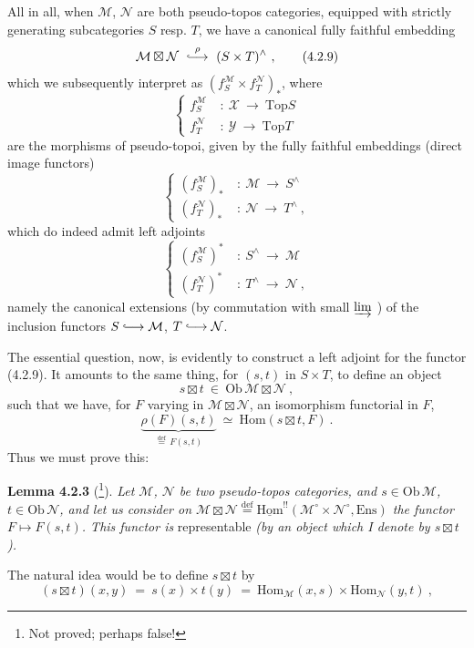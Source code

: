 \documentclass[11pt]{article}
\newcommand{\printedpage}[1]{\marginpar{\footnotesize p.~#1}}
\newcommand{\msp}[1]{\marginpar{\footnotesize [#1]}}
\newcommand{\cM}{\mathcal{M}}
\newcommand{\cN}{\mathcal{N}}
\newcommand{\cX}{\mathcal{X}}
\newcommand{\cY}{\mathcal{Y}}
\newcommand{\uHom}{\underline{\mathrm{Hom}}}
\newcommand{\Hom}{\mathrm{Hom}}
\newcommand{\Ens}{\mathrm{Ens}}
\newcommand{\Top}{\mathrm{Top}}
\newcommand{\Ob}{\mathrm{Ob}\,}
\newcommand{\defeq}{\overset{\text{def}}{=}}
\newcommand{\bt}{\boxtimes}
\newcommand{\linj}{\lhook\joinrel\longrightarrow}
\begin{document}
All in all, when $\cM$, $\cN$ are both pseudo-topos categories, equipped with strictly generating subcategories $S$ resp. $T$, we have a canonical fully faithful embedding
\[
\cM\bt\cN \ \overset{\rho}{\linj}\ (S\times T)^{\wedge} \ ,
\tag*{(4.2.9)}
\]
\printedpage{7}
which we subsequently interpret as $(f_{S}^{\cM}\times f_{T}^{\cN})_{*}$, where
\[
\left\{
\begin{aligned}
f_{S}^{\cM} \ &:\ \cX \ \longrightarrow\ \Top S\\
f_{T}^{\cN} \ &:\ \cY \ \longrightarrow\ \Top T
\end{aligned}
\right.
\tag*{(4.2.10)}
\]
are the morphisms of pseudo-topoi, given by the fully faithful embeddings (direct image functors)
\[
\left\{
\begin{aligned}
(f_{S}^{\cM})_{*} \ &:\ \cM \ \longrightarrow\ S^{\wedge}\\
(f_{T}^{\cN})_{*} \ &:\ \cN \ \longrightarrow\ T^{\wedge} \ ,
\end{aligned}
\right.
\tag*{(4.2.11)}
\]
which do indeed admit left adjoints
\msp{page 63}
\[
\left\{
\begin{aligned}
(f_{S}^{\cM})^{*} \ &:\ S^{\wedge} \ \longrightarrow\ \cM\\
(f_{T}^{\cN})^{*} \ &:\ T^{\wedge} \ \longrightarrow\ \cN \ ,
\end{aligned}
\right.
\tag*{(4.2.12)}
\]
namely the canonical extensions (by commutation with small $\varinjlim$ ) of the inclusion functors $S \linj \cM$, $T \linj \cN$.

The essential question, now, is evidently to construct a left adjoint for the functor (4.2.9). It amounts to the same thing, for $(s,t)$ in $S\times T$, to define an object
\[
s\bt t \ \in\ \Ob\cM\bt\cN \ ,
\tag*{(4.2.13)}
\]
such that we have, for $F$ varying in $\cM\bt\cN$, an isomorphism functorial in $F$,
\[
\underbrace{\rho(F)(s,t)}_{\defeq\, F(s,t)} \ \simeq\ \Hom(s\bt t,F) \ .
\]
Thus we must prove this:

\textbf{Lemma 4.2.3} (\footnote[4]{Not proved; perhaps false!}). \textit{Let $\cM$, $\cN$ be two pseudo-topos categories, and $s\in\Ob\cM$, $t\in\Ob\cN$, and let us consider on $\cM\bt\cN\defeq\uHom^{!!}(\cM^{\circ}\times\cN^{\circ},\Ens)$ the functor $F\longmapsto F(s,t)$. This functor is} representable \textit{(by an object which I denote by $s\bt t$).}

The natural idea would be to define $s\bt t$ by
\[
(s\bt t)(x,y) \ =\ s(x)\times t(y) \ =\ \Hom_{\cM}(x,s)\times\Hom_{\cN}(y,t) \ ,
\]
\end{document}
